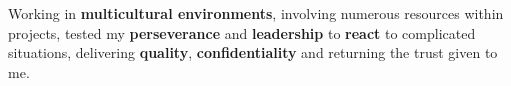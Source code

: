 
Working in \textbf{multicultural environments}, involving numerous
resources within projects, tested my \textbf{perseverance}
and \textbf{leadership} to \textbf{react} to complicated situations,
delivering \textbf{quality}, \textbf{confidentiality} and returning the
trust given to me.

